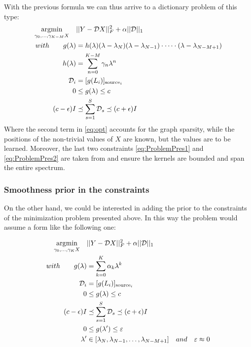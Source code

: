 With the previous formula we can thus arrive to a dictionary problem of this type:
\begin{align}
\underset{{\gamma_0,\dots,\gamma_{K-M}X}}{\arg\!\min} \quad& ||Y - \mathcal{D}X||^2_F + \alpha||\mathcal{D}||_1 \label{eq:opt}\\
with \qquad g(\lambda) &= h(\lambda)(\lambda - \lambda_N)(\lambda - \lambda_{N-1})\cdot \dots \cdot (\lambda - \lambda_{N-M+1}) \notag\\
h(\lambda) &= \sum_{n=0}^{K-M}\gamma_n\lambda^{n} \notag\\
\mathcal{D}_i &= [g(L_i)]_{\text{source}_i} \notag\\
0 &\leq g(\lambda) \leq c \label{eq:ProblemPres1}\\
(c-\epsilon)I &\preceq \sum_{s=1}^{S}\mathcal{D}_s \preceq (c+\epsilon)I \label{eq:ProblemPres2}
\end{align}
Where the second term in \autoref{eq:opt} accounts for the graph sparsity, while the positions of the non-trivial values of $X$ are known, but the values are to be learned. Moreover, the last two constraints \autoref{eq:ProblemPres1} and \autoref{eq:ProblemPres2} are taken from \cite{Thanou2014} and ensure the kernels are bounded and span the entire spectrum.
\label{sec:DictionaryLearningSection}

\subsubsection{Smoothness prior in the constraints}
On the other hand, we could be interested in adding the prior to the constraints of the minimization problem presented above. In this way the problem would assume a form like the following one:

\begin{align}
\underset{{\gamma_0,\dots,\gamma_{K}X}}{\arg\!\min} \quad& ||Y - \mathcal{D}X||^2_F + \alpha||\mathcal{D}||_1 \label{eq:optConstraint}\\
with \qquad g(\lambda) &= \sum_{k=0}^{K}\alpha_k\lambda^{k} \notag\\
\mathcal{D}_i &= [g(L_i)]_{\text{source}_i} \notag\\
0 &\leq g(\lambda) \leq c \label{eq:ProblemPresConstraint1}\\
(c-\epsilon)I &\preceq \sum_{s=1}^{S}\mathcal{D}_s \preceq (c+\epsilon)I \notag\\
0 & \leq g(\lambda') \leq \varepsilon \notag\\
\lambda' & \in [\lambda_{N}, \lambda_{N-1},\dots,\lambda_{N-M+1}] \quad and \quad \varepsilon \approx 0 \label{eq:ProblemPresConstraint2}
\end{align}

